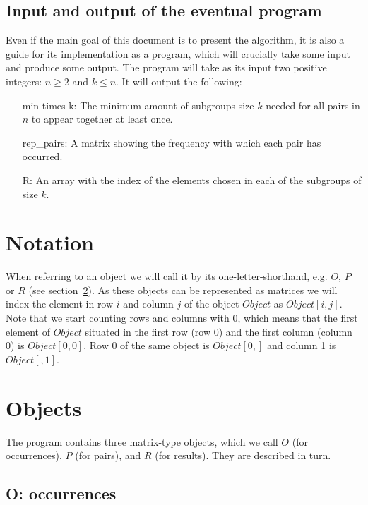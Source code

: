 \documentclass[a4paper]{article}
\begin{document}
\subsection{Input and output of the eventual program}

Even if the main goal of this document is to present the algorithm, it is also a guide for its implementation as a program, which will crucially take some input and produce some output.
The program will take as its input two positive integers: $ n \geq 2$ and $k \leq n$.
It will output the following:

\begin{itemize}
\item[min-times-k:]
The minimum amount of subgroups size $k$ needed for all pairs in $n$ to appear together at least once.
\item[rep\_pairs:]
A matrix showing the frequency with which each pair has occurred.
\item[R:] 
An array with the index of the elements chosen in each of the subgroups of size $k$.
\end{itemize}

\section{Notation}

When referring to an object we will call it by its one-letter-shorthand, e.g. $O$, $P$ or $R$ (see section~\ref{sec:objects}).
As these objects can be represented as matrices we will index the element in row $i$ and column $j$ of the object $Object$ as $Object[i,j]$.
Note that we start counting rows and columns with $0$,
which means that the first element of $Object$ situated in the first row (row 0) and the first column (column 0) is $Object[0,0]$.
Row 0 of the same object is $Object[0,]$ and column 1 is $Object[,1]$.

\section{Objects}
\label{sec:objects}

The program contains three matrix-type objects, which we call $O$ (for occurrences),
$P$ (for pairs), 
and $R$ (for results).
They are described in turn.

\subsection{O: occurrences}
\label{ssec:occurr}
\end{document}
